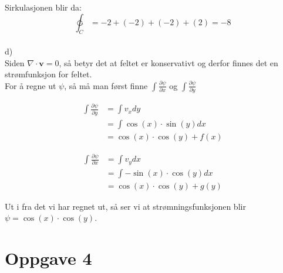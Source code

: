 \documentclass[12pt, a4paper]{article}
\begin{document}
Sirkulasjonen blir da:
\begin{equation}
    \ointctrclockwise_C = -2 + (-2) + (-2) + (2) = -8
\end{equation}
\\
d) \\
Siden $\nabla \cdot \textbf{v} = 0$, så betyr det at feltet er konservativt og derfor finnes det en strømfunksjon for feltet. \\
For å regne ut $\psi$, så må man først finne $\int \frac{\partial \psi}{\partial x}$ og $\int \frac{\partial \psi}{\partial y}$

\begin{equation}
    \begin{split}
        \int \frac{\partial \psi}{\partial y} &= \int v_x dy \\
                                              &= \int \cos(x) \cdot \sin(y) dx \\
                                              &= \cos(x) \cdot \cos(y) + f(x)
    \end{split}
\end{equation}

\begin{equation}
    \begin{split}
        \int \frac{\partial \psi}{\partial x} &= \int v_y dx \\
                                              &= \int -\sin(x) \cdot \cos(y) dx \\
                                              &= \cos(x) \cdot \cos(y) + g(y)
    \end{split}
\end{equation}

Ut i fra det vi har regnet ut, så ser vi at strømningsfunksjonen blir $\psi = \cos(x) \cdot \cos(y)$.



\newpage
\section*{Oppgave 4}
\end{document}
